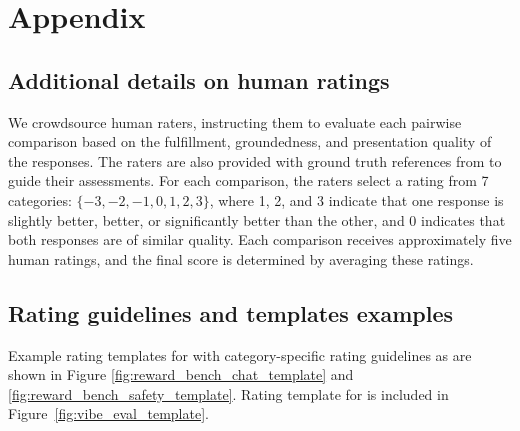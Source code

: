 \section{Appendix}\label{sec:appendix}

\subsection{Additional details on \VibeEval human ratings}\label{app:vibe_eval_details}
We crowdsource human raters, instructing them to evaluate each pairwise comparison based on the fulfillment, groundedness, and presentation quality of the responses. The raters are also provided with ground truth references from \VibeEval to guide their assessments. For each comparison, the raters select a rating from 7 categories: $\{-3, -2, -1, 0, 1, 2, 3\}$, where 1, 2, and 3 indicate that one response is slightly better, better, or significantly better than the other, and 0 indicates that both responses are of similar quality. Each comparison receives approximately five human ratings, and the final score is determined by averaging these ratings.

\subsection{Rating guidelines and templates examples}\label{app:reward_vibe_templates}
Example rating templates for \RewardBench with category-specific rating guidelines as \PI are shown in Figure \ref{fig:reward_bench_chat_template} and \ref{fig:reward_bench_safety_template}. Rating template for \VibeEval is included in Figure~\ref{fig:vibe_eval_template}.


